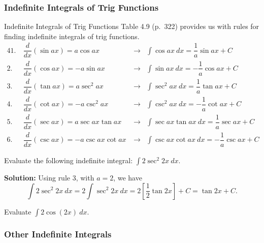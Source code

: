 \documentclass[cal1spr16Lectures.tex]{subfiles}
\begin{document}
\subsubsection{Indefinite Integrals of Trig Functions}

\begin{frame}{\small Indefinite Integrals of Trig Functions}\footnotesize
Table 4.9 (p.\ 322) provides us with rules for finding indefinite integrals of trig functions.
\begin{alignat*}{4}
1.\ &\dfrac{d}{dx} (\sin ax) = a\cos ax &\longrightarrow &\int \cos ax\ dx = \dfrac{1}{a} \sin ax + C \\
2.\ &\dfrac{d}{dx} (\cos ax) = -a\sin ax &\longrightarrow &\int \sin ax\ dx = -\dfrac{1}{a} \cos ax + C \\
3.\ &\dfrac{d}{dx} (\tan ax) = a\sec^2 ax &\longrightarrow &\int \sec^2 ax\ dx = \dfrac{1}{a} \tan ax + C \\
4.\ &\dfrac{d}{dx} (\cot ax) = -a\csc^2 ax &\longrightarrow &\int \csc^2 ax\ dx = -\dfrac{1}{a} \cot ax + C \\
5.\ &\dfrac{d}{dx} (\sec ax) = a\sec ax \tan ax &\longrightarrow &\int \sec ax \tan ax\ dx = \dfrac{1}{a} \sec ax + C \\
6.\ &\dfrac{d}{dx} (\csc ax) = -a\csc ax \cot ax \ &\longrightarrow &\int \csc ax \cot ax\ dx = -\dfrac{1}{a} \csc ax + C
\end{alignat*}
\end{frame}

\begin{frame}\footnotesize
\begin{ex} 
Evaluate the following indefinite integral: $\int 2 \sec^2 2x\ dx$. 
\end{ex}

\vspace{1pc}
{\bf Solution:}  Using rule 3, with $a=2$, we have
\[\int 2 \sec^2 2x\ dx = 2 \int \sec^2 2x\ dx = 2 \left[ \dfrac{1}{2} \tan 2x \right] + C = \tan 2x + C.\]

\vspace{1pc}
\begin{exe} 
Evaluate $\int 2 \cos(2x)\ dx$. 
\end{exe}
\end{frame}

\subsubsection{Other Indefinite Integrals}
\end{document}
